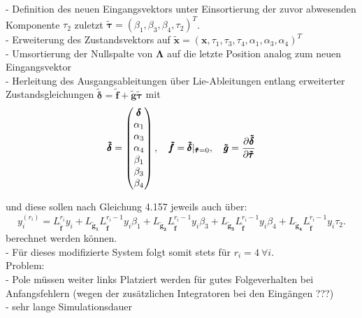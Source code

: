 - Definition des neuen Eingangsvektors unter Einsortierung der zuvor abwesenden Komponente $\tau_2$ zuletzt $\pmb{\tilde{\tau}} = (\beta_1,  \beta_3,  \beta_4, \tau_2)^T$. \\

- Erweiterung des Zustandsvektors auf $\tilde{\pmb{x}} = (\pmb{x}, \tau_1, \tau_3, \tau_4, \alpha_1, \alpha_3, \alpha_4)^T$ \\
- Umsortierung der Nullspalte von $\pmb{\Lambda}$ auf die letzte Position analog zum neuen Eingangsvektor \\
- Herleitung des Ausgangsableitungen über Lie-Ableitungen entlang erweiterter Zustandsgleichungen  $\pmb{\tilde{\delta}} = \pmb{\tilde{f}} + \pmb{\tilde{g}} \pmb{\tilde{\tau}}$ mit
\begin{align}
	\pmb{\tilde{\delta}} =
	\left(\begin{matrix}
		\pmb{\delta} \\
		\alpha_1 \\
		\alpha_3 \\
		\alpha_4 \\
		\beta_1 \\
		\beta_3 \\
		\beta_4 \\	
	\end{matrix}\right), \quad
	\pmb{\tilde{f}} = \pmb{\tilde{\delta}}|_{\pmb{\tilde{\tau}} = 0}, \quad
	\pmb{\tilde{g}} = \frac{\partial^{}\pmb{\tilde{\delta}}}{\partial{\pmb{\tilde{\tau}}}^{}}
\end{align}

und diese sollen nach \cite[S. 195]{NLRT_Roebenack} Gleichung 4.157 jeweils auch über:
\begin{equation}
	y_i^{(r_i)} = L_{\pmb{\tilde{f}}}^{r_i} y_i + L_{\pmb{\tilde{g}_1}} L_{\pmb{\tilde{f}}}^{r_i-1} y_i \beta_1 + L_{\pmb{\tilde{g}_2}} L_{\pmb{\tilde{f}}}^{r_i-1} y_i \beta_3 + L_{\pmb{\tilde{g}_3}} L_{\pmb{\tilde{f}}}^{r_i-1} y_i \beta_4 + L_{\pmb{\tilde{g}_4}} L_{\pmb{\tilde{f}}}^{r_i-1} y_i \tau_2 .
\end{equation}
berechnet werden können.\\
- Für dieses modifizierte System folgt somit stets für $r_i = 4 \ \forall i$. \\

Problem:\\
- Pole müssen weiter links Platziert werden für gutes Folgeverhalten bei Anfangsfehlern (wegen der zusätzlichen Integratoren bei den Eingängen ???) \\
- sehr lange Simulationsdauer

